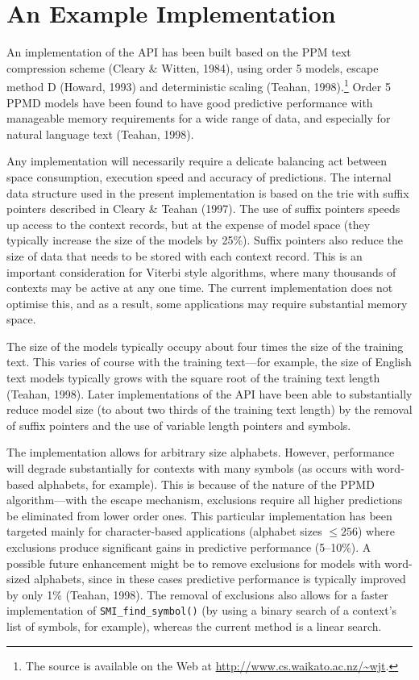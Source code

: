 \documentclass[11pt]{article}
\begin{document}
\section{An Example Implementation}

\label{section.implementation}

An implementation of the API has been built based on the PPM text compression
scheme (Cleary \& Witten, 1984), using order 5 models, escape method D
(Howard, 1993) and deterministic scaling (Teahan, 1998).\footnote{The
source is available on the Web at \url{http://www.cs.waikato.ac.nz/~wjt}.}
Order 5 PPMD models have been found to have good predictive performance
with manageable memory requirements for a wide range of data, and
especially for natural language text (Teahan, 1998).

Any implementation will necessarily require a delicate balancing act
between space consumption, execution speed and accuracy of predictions.
The internal data structure used in the present implementation is based on
the trie with suffix pointers described in Cleary \& Teahan (1997). The use
of suffix pointers speeds up access to the context records, but at the
expense of model space (they typically increase the size of the models by
25\%). Suffix pointers also reduce the size of data that needs to be stored
with each context record. This is an important consideration for Viterbi
style algorithms, where many thousands of contexts may be active at
any one time. The current implementation does not optimise this, and as a
result, some applications may require substantial memory space.

The size of the models typically occupy about four times the size of the
training text. This varies of course with the training text---for example,
the size of English text models typically grows with the square root of the
training text length (Teahan, 1998). Later implementations of the API have
been able to substantially reduce model size (to about two thirds of the
training text length) by the removal of suffix pointers and the use of
variable length pointers and symbols.

The implementation allows for arbitrary size alphabets. However,
performance will degrade substantially for contexts with many symbols (as
occurs with word-based alphabets, for example).  This is because of the
nature of the PPMD algorithm---with the escape mechanism, exclusions
require all higher predictions be eliminated from lower order ones. This
particular implementation has been targeted mainly for character-based
applications (alphabet sizes $\leq 256$) where exclusions produce
significant gains in predictive performance (5--10\%).  A possible future
enhancement might be to remove exclusions for models with word-sized
alphabets, since in these cases predictive performance is typically
improved by only 1\% (Teahan, 1998). The removal of exclusions also allows
for a faster implementation of \verb|SMI_find_symbol()| (by using a
binary search of a context's list of symbols, for example), whereas the
current method is a linear search.
\end{document}
